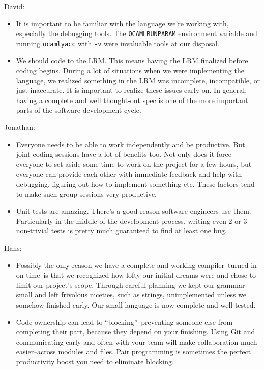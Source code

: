 David:
\begin{itemize}
\item It is important to be familiar with the language we're working with, especially the debugging tools. The \texttt{OCAMLRUNPARAM} environment variable and running \texttt{ocamlyacc} with \texttt{-v} were invaluable tools at our disposal. 
\item We should code to the LRM. This means having the LRM finalized before coding begins. During a lot of situations when we were implementing the language, we realized something in the LRM was incomplete, incompatible, or just inaccurate. It is important to realize these issues early on. In general, having a complete and well thought-out spec is one of the more important parts of the software development cycle. 
\end{itemize}

Jonathan:
\begin{itemize}
\item Everyone needs to be able to work independently and be productive. But joint coding sessions have a lot of benefits too. Not only does it force everyone to set aside some time to work on the project for a few hours, but everyone can provide each other with immediate feedback and help with debugging, figuring out how to implement something etc. These factors tend to make such group sessions very productive. 
\item Unit tests are amazing. There's a good reason software engineers use them. Particularly in the middle of the development process, writing even 2 or 3 non-trivial tests is pretty much guaranteed to find at least one bug. 
\end{itemize}

Hans:
\begin{itemize}
\item Possibly the only reason we have a complete and working compiler--turned in on time--is that we recognized how lofty our initial dreams were and chose to limit our project's scope. Through careful planning we kept our grammar small and left frivolous niceties, such as strings, unimplemented unless we somehow finished early. Our small language is now complete and well-tested.
\item Code ownership can lead to ``blocking''--preventing someone else from completing their part, because they depend on your finishing. Using Git and communicating early and often with your team will make collaboration much easier--across modules and files. Pair programming is sometimes the perfect productivity boost you need to eliminate blocking.
\end{itemize}

